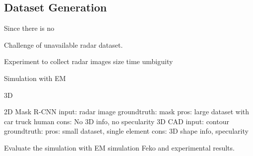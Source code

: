 \subsection{Dataset Generation}
Since there is no

Challenge of unavailable radar dataset.

Experiment to collect radar images size time umbiguity

Simulation with EM 

3D %

2D
	Mask R-CNN
		input: radar image
		groundtruth: mask
	pros: large dataset with car truck human 
	cons: No 3D info, no specularity
	3D CAD
		input: contour
		groundtruth:
	pros: small dataset, single element 
	cons: 3D shape info, specularity 


Evaluate the simulation with EM simulation Feko and experimental results.

